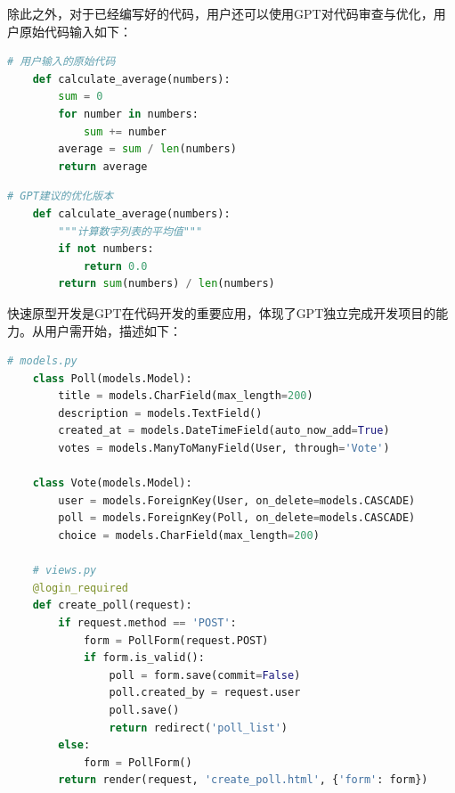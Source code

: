 除此之外，对于已经编写好的代码，用户还可以使用GPT对代码审查与优化，用户原始代码输入如下：

\begin{promptbox}
\small{\begin{lstlisting}[language=Python]
    # 用户输入的原始代码
    def calculate_average(numbers):
        sum = 0
        for number in numbers:
            sum += number
        average = sum / len(numbers)
        return average
\end{lstlisting}}
\end{promptbox}

\begin{gptbox}
\small{
\begin{lstlisting}[language=Python]
    # GPT建议的优化版本
    def calculate_average(numbers):
        """计算数字列表的平均值"""
        if not numbers:
            return 0.0
        return sum(numbers) / len(numbers)
\end{lstlisting}
}
\end{gptbox}

快速原型开发是GPT在代码开发的重要应用，体现了GPT独立完成开发项目的能力。从用户需开始，描述如下：



\begin{gptbox}
\small{
\begin{lstlisting}[language=Python]
    # models.py
    class Poll(models.Model):
        title = models.CharField(max_length=200)
        description = models.TextField()
        created_at = models.DateTimeField(auto_now_add=True)
        votes = models.ManyToManyField(User, through='Vote')
    
    class Vote(models.Model):
        user = models.ForeignKey(User, on_delete=models.CASCADE)
        poll = models.ForeignKey(Poll, on_delete=models.CASCADE)
        choice = models.CharField(max_length=200)
    
    # views.py
    @login_required
    def create_poll(request):
        if request.method == 'POST':
            form = PollForm(request.POST)
            if form.is_valid():
                poll = form.save(commit=False)
                poll.created_by = request.user
                poll.save()
                return redirect('poll_list')
        else:
            form = PollForm()
        return render(request, 'create_poll.html', {'form': form})
\end{lstlisting}
}
\end{gptbox}


